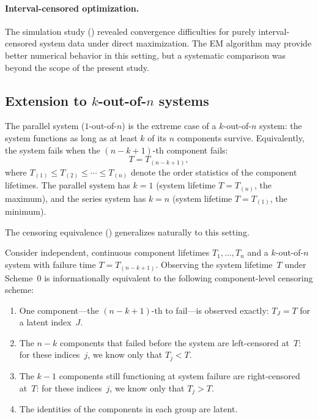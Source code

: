 \paragraph{Interval-censored optimization.}
The simulation study () revealed convergence
difficulties for purely interval-censored system data under direct
maximization.  The EM algorithm may provide better numerical behavior
in this setting, but a systematic comparison was beyond the scope of
the present study.

\subsection{Extension to $k$-out-of-$n$ systems}
\label{sec:k-out-of-n}

The parallel system ($1$-out-of-$n$) is the extreme case of a
$k$-out-of-$n$ system: the system functions as long as at least $k$ of
its $n$ components survive.  Equivalently, the system fails when the
$(n - k + 1)$-th component fails:
\begin{equation}\label{eq:kofn-lifetime}
  T = T_{(n-k+1)},
\end{equation}
where $T_{(1)} \leq T_{(2)} \leq \cdots \leq T_{(n)}$ denote the order
statistics of the component lifetimes.  The parallel system has $k = 1$
(system lifetime $T = T_{(n)}$, the maximum), and the series system has
$k = n$ (system lifetime $T = T_{(1)}$, the minimum).

The censoring equivalence () generalizes
naturally to this setting.

\begin{proposition}
\label{prop:kofn-censoring}
Consider independent, continuous component lifetimes
$T_1, \ldots, T_n$ and a $k$-out-of-$n$ system with failure
time $T = T_{(n-k+1)}$.  Observing the system lifetime~$T$ under
Scheme~0 is informationally equivalent to the following component-level
censoring scheme:
\begin{enumerate}
  \item[\textup{(a)}] One component---the $(n-k+1)$-th to fail---is
    observed exactly: $T_J = T$ for a latent index~$J$.
  \item[\textup{(b)}] The $n - k$ components that failed before the system
    are left-censored at~$T$: for these indices~$j$, we know only that
    $T_j < T$.
  \item[\textup{(c)}] The $k - 1$ components still functioning at system
    failure are right-censored at~$T$: for these indices~$j$, we know
    only that $T_j > T$.
  \item[\textup{(d)}] The identities of the components in each group are
    latent.
\end{enumerate}
\end{proposition}

